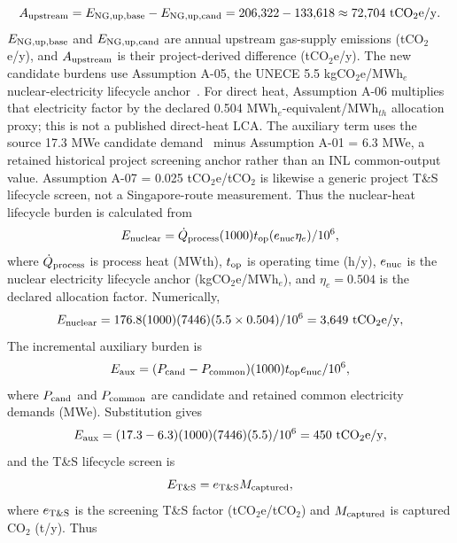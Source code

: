 \begin{equation}\label{eq:upstream-ng-saving}
A_{\rm upstream}=E_{\rm NG,up,base}-E_{\rm NG,up,cand}
=206{,}322-133{,}618\approx72{,}704~\mathrm{tCO_2e/y}.
\end{equation}
$E_{\rm NG,up,base}$ and $E_{\rm NG,up,cand}$ are annual upstream gas-supply emissions (tCO$_2$e/y), and $A_{\rm upstream}$ is their project-derived difference (tCO$_2$e/y).  The new candidate burdens use Assumption A-05, the UNECE 5.5 kgCO$_2$e/MWh$_e$ nuclear-electricity lifecycle anchor~\cite{unece2022lca}. For direct heat, Assumption A-06 multiplies that electricity factor by the declared 0.504 MWh$_e$-equivalent/MWh$_{th}$ allocation proxy; this is not a published direct-heat LCA. The auxiliary term uses the source 17.3 MWe candidate demand~\cite{inltev961} minus Assumption A-01 = 6.3 MWe, a retained historical project screening anchor rather than an INL common-output value. Assumption A-07 = 0.025 tCO$_2$e/tCO$_2$ is likewise a generic project T\&S lifecycle screen, not a Singapore-route measurement. Thus the nuclear-heat lifecycle burden is calculated from
\begin{equation}\label{eq:nuclear-lca-general}
E_{\rm nuclear}=\dot Q_{\rm process}(1000)t_{\rm op}(e_{\rm nuc}\eta_e)/10^6,
\end{equation}
where $\dot Q_{\rm process}$ is process heat (MWth), $t_{\rm op}$ is operating time (h/y), $e_{\rm nuc}$ is the nuclear electricity lifecycle anchor (kgCO$_2$e/MWh$_e$), and $\eta_e=0.504$ is the declared allocation factor. Numerically,
\begin{equation}\label{eq:nuclear-lca}
E_{\rm nuclear}=176.8(1000)(7446)(5.5\times0.504)/10^6
=3{,}649~\mathrm{tCO_2e/y},
\end{equation}
The incremental auxiliary burden is
\begin{equation}\label{eq:aux-lca-general}
E_{\rm aux}=(P_{\rm cand}-P_{\rm common})(1000)t_{\rm op}e_{\rm nuc}/10^6,
\end{equation}
where $P_{\rm cand}$ and $P_{\rm common}$ are candidate and retained common electricity demands (MWe). Substitution gives
\begin{equation}\label{eq:aux-lca}
E_{\rm aux}=(17.3-6.3)(1000)(7446)(5.5)/10^6
=450~\mathrm{tCO_2e/y},
\end{equation}
and the T\&S lifecycle screen is
\begin{equation}\label{eq:ts-lca-general}
E_{\rm T\&S}=e_{\rm T\&S}M_{\rm captured},
\end{equation}
where $e_{\rm T\&S}$ is the screening T\&S factor (tCO$_2$e/tCO$_2$) and $M_{\rm captured}$ is captured CO$_2$ (t/y). Thus
